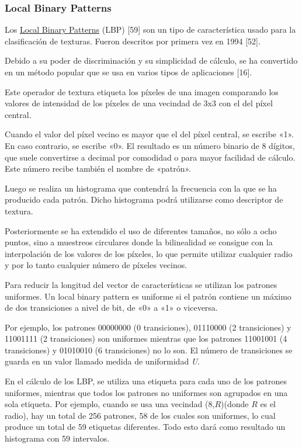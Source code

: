\subsubsection*{Local Binary Patterns}
Los \underline{Local Binary Patterns} (LBP) [59] son un tipo de característica usado para la clasificación
de texturas. Fueron descritos por primera vez en 1994 [52].

Debido a su poder de discriminación y su simplicidad de cálculo, se ha convertido en un método popular que se usa en varios tipos de aplicaciones [16].

Este operador de textura etiqueta los píxeles de una imagen comparando los valores de intensidad de los píxeles de una vecindad de 3x3 con el del píxel central.

Cuando el valor del píxel vecino es mayor que el del píxel central, se escribe «1». En caso contrario, se escribe «0». El resultado es un número binario de 8 dígitos, que suele convertirse a decimal por comodidad o para mayor facilidad de cálculo. Este número recibe también el nombre de «patrón».

Luego se realiza un histograma que contendrá la frecuencia con la que se ha producido cada patrón. Dicho histograma podrá utilizarse como descriptor de textura.

Posteriormente se ha extendido el uso de diferentes tamaños, no sólo a ocho puntos, sino a muestreos circulares donde la bilinealidad se consigue con la interpolación de los valores de los píxeles, lo que permite utilizar cualquier radio y por lo tanto cualquier número de píxeles vecinos.

Para reducir la longitud del vector de características se utilizan los patrones uniformes. Un local binary pattern es uniforme si el patrón contiene un máximo de dos transiciones a nivel de bit, de «0» a «1» o viceversa.


Por ejemplo, los patrones 00000000 (0 transiciones), 01110000 (2 transiciones) y 11001111 (2 transiciones) son uniformes mientras que los patrones 11001001 (4 transiciones) y 01010010 (6 transiciones) no lo son. El número de transiciones se guarda en un valor llamado medida de uniformidad \textit{U}.

En el cálculo de los LBP, se utiliza una etiqueta para cada uno de los patrones uniformes, mientras que todos los patrones no uniformes son agrupados en una sola etiqueta. Por ejemplo, cuando se usa una vecindad (8,$R$)(donde $R$ es el radio), hay un total de 256 patrones, 58 de los cuales son uniformes, lo cual produce un total de 59 etiquetas diferentes. Todo esto dará como resultado un histograma con 59 intervalos.
\newpage


